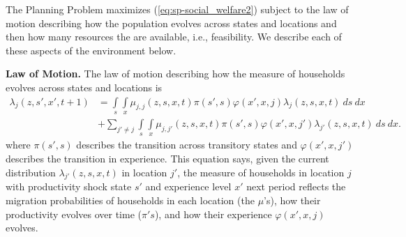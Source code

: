 \documentclass[12pt,pdftex]{article}
\begin{document}
\begin{onehalfspacing}
The Planning Problem maximizes (\ref{eq:sp-social_welfare2}) subject to the law of motion describing how the population evolves across states and locations and then how many resources the are available, i.e., feasibility. We describe each of these aspects of the environment below.

\textbf{Law of Motion.} The law of motion describing how the measure of households evolves across states and locations is
\begin{align}
\lambda_{j}(z, s', x', t+1)  & =  \int\limits_{s} \int\limits_{x}  \mu_{j,j}(z, s,x,t)\pi(s',s) \varphi(x',x, j) \lambda_{j}(z, s, x, t)  \ ds \ dx  \  \label{eq:planner_law_motion} \\
& +  \sum_{j' \neq j} \int\limits_{s} \int\limits_{x} \mu_{j,j'}(z, s,x,t) \pi(s',s) \varphi(x',x, j') \lambda_{j'}(z, s, x, t)  \ ds  \ dx. \nonumber
\end{align}
where $\pi(s',s)$ describes the transition across transitory states and $\varphi(x',x, j')$ describes the transition in experience. This equation says, given the current distribution  $\lambda_{j'}(z, s, x, t)$ in location $j'$, the measure of households in location $j$ with productivity shock state $s'$ and experience level $x'$ next period reflects the migration probabilities of households in each location (the $\mu$'s), how their productivity evolves over time ($\pi's$), and how their experience $\varphi(x',x, j)$ evolves.


\end{onehalfspacing}
\end{document}
